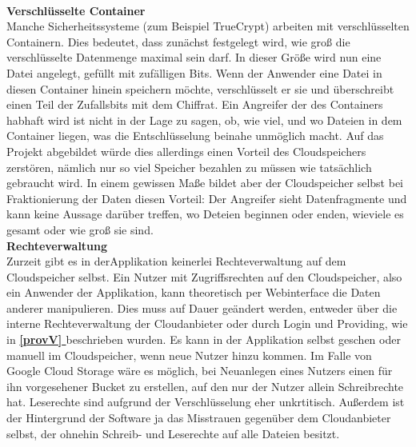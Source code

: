 \documentclass[12pt,a4paper,bibliography=totocnumbered,listof=totocnumbered]{scrartcl}
\newcommand*{\fullref}[1]{\textbf{\hyperref[{#1}]{\ref*{#1} \nameref*{#1}}}}
\begin{document}
\\\textbf{Verschlüsselte Container}\\
Manche Sicherheitssysteme (zum Beispiel TrueCrypt) arbeiten mit verschlüsselten Containern. Dies bedeutet, dass zunächst festgelegt wird, wie groß die verschlüsselte Datenmenge maximal sein darf. In dieser Größe wird nun eine Datei angelegt, gefüllt mit zufälligen Bits. Wenn der Anwender eine Datei in diesen Container hinein speichern möchte, verschlüsselt er sie und überschreibt einen Teil der Zufallsbits mit dem Chiffrat. Ein Angreifer der des Containers habhaft wird ist nicht in der Lage zu sagen, ob, wie viel, und wo Dateien in dem Container liegen, was die Entschlüsselung beinahe unmöglich macht. Auf das Projekt abgebildet würde dies allerdings einen Vorteil des Cloudspeichers zerstören, nämlich nur so viel Speicher bezahlen zu müssen wie tatsächlich gebraucht wird. In einem gewissen Maße bildet aber der Cloudspeicher selbst bei Fraktionierung der Daten diesen Vorteil: Der Angreifer sieht Datenfragmente und kann keine Aussage darüber treffen, wo Deteien beginnen oder enden, wieviele es gesamt oder wie groß sie sind.
\\\textbf{Rechteverwaltung}\\
Zurzeit gibt es in derApplikation keinerlei Rechteverwaltung auf dem Cloudspeicher selbst. Ein Nutzer mit Zugriffsrechten auf den Cloudspeicher, also ein Anwender der Applikation, kann theoretisch per Webinterface die Daten anderer manipulieren. Dies muss auf Dauer geändert werden, entweder über die interne Rechteverwaltung der Cloudanbieter oder durch Login und Providing, wie in \fullref{provV} beschrieben wurden. Es kann in der Applikation selbst geschen oder manuell im Cloudspeicher, wenn neue Nutzer hinzu kommen. Im Falle von Google Cloud Storage wäre es möglich, bei Neuanlegen eines Nutzers einen für ihn vorgesehener Bucket zu erstellen, auf den nur der Nutzer allein Schreibrechte hat. Leserechte sind aufgrund der Verschlüsselung eher unkrtitisch. Außerdem ist der Hintergrund der Software ja das Misstrauen gegenüber dem Cloudanbieter selbst, der ohnehin Schreib- und Leserechte auf alle Dateien besitzt.
\pagebreak


	
{\raggedright 

 
 
 \nocite{41}
 \nocite{42}
 \nocite{43}
 \nocite{44}
}
\pagebreak
\end{document}
